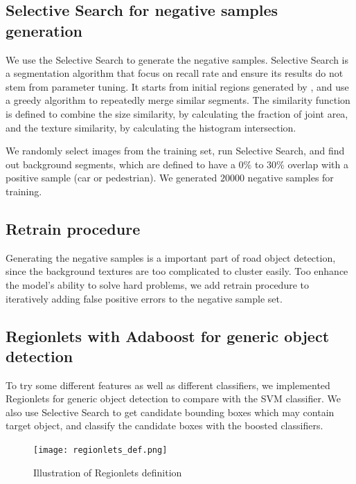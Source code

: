 \documentclass{article} %
\begin{document}
\subsection{Selective Search for negative samples generation}

We use the Selective Search \cite{van2011segmentation} to generate the negative samples. Selective Search is a segmentation algorithm that focus on recall rate and ensure its results do not stem from parameter tuning. It starts from initial regions generated by \cite{felzenszwalb2004efficient}, and use a greedy algorithm to repeatedly merge similar segments. The similarity function is defined to combine the size similarity, by calculating the fraction of joint area, and the texture similarity, by calculating the histogram intersection.

We randomly select images from the training set, run Selective Search, and find out background segments, which are defined to have a $0\%$ to $30\%$ overlap with a positive sample (car or pedestrian). We generated $20000$ negative samples for training. 

\subsection{Retrain procedure}

Generating the negative samples is a important part of road object detection, since the background textures are too complicated to cluster easily. Too enhance the model's ability to solve hard problems, we add retrain procedure \cite{felzenszwalb2010object} to iteratively adding false positive errors to the negative sample set.


\subsection{Regionlets with Adaboost for generic object detection}

To try some different features as well as different classifiers, we implemented Regionlets \cite{Wang2013} for generic object detection to compare with the SVM classifier. We also use Selective Search \cite{van2011segmentation} to get candidate bounding boxes which may contain target object, and classify the candidate boxes with the boosted classifiers.


\begin{figure}[htb]
	\centering
	\texttt{[image: regionlets\_def.png]}
	\caption{Illustration of Regionlets definition}
	\label{fig:regionlet_def}
\end{figure}
\end{document}
